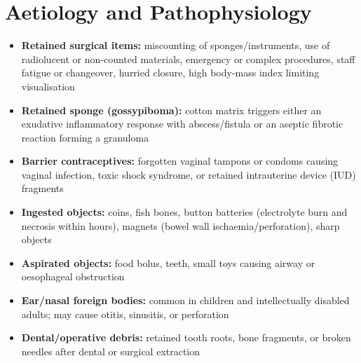 \section*{Aetiology and Pathophysiology}
\begin{itemize}
    \item \textbf{Retained surgical items:} miscounting of sponges/instruments, use of radiolucent or non-counted materials, emergency or complex procedures, staff fatigue or changeover, hurried closure, high body-mass index limiting visualisation
    \item \textbf{Retained sponge (gossypiboma):} cotton matrix triggers either an exudative inflammatory response with abscess/fistula or an aseptic fibrotic reaction forming a granuloma
    \item \textbf{Barrier contraceptives:} forgotten vaginal tampons or condoms causing vaginal infection, toxic shock syndrome, or retained intrauterine device (IUD) fragments
    \item \textbf{Ingested objects:} coins, fish bones, button batteries (electrolyte burn and necrosis within hours), magnets (bowel wall ischaemia/perforation), sharp objects
    \item \textbf{Aspirated objects:} food bolus, teeth, small toys causing airway or oesophageal obstruction
    \item \textbf{Ear/nasal foreign bodies:} common in children and intellectually disabled adults; may cause otitis, sinusitis, or perforation
    \item \textbf{Dental/operative debris:} retained tooth roots, bone fragments, or broken needles after dental or surgical extraction
\end{itemize}

